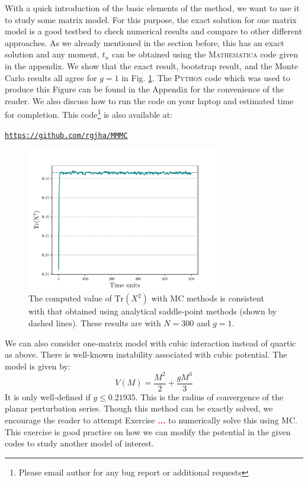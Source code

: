 \documentclass[11pt]{article}
\newcommand{\TODO}[1]{\textcolor{red}{{\bf #1}}}
\newcommand{\MA}{\textsc{Mathematica }}
\newcommand{\PY}{\textsc{Python }}
\begin{document}
With a quick introduction of the basic elements of the method, we want to use it to study some matrix model. For this purpose, 
the exact solution for one matrix model is a good testbed to check numerical results and compare to other different approaches. As we already mentioned in the section before, this has an exact solution and any moment, $t_{n}$ 
can be obtained using the \MA code given in the appendix. We show that the exact result, bootstrap result, and the 
Monte Carlo results all agree for $g=1$ in Fig. \ref{fig:1MM_res}. The \PY code which was used to produce this 
Figure can be found in the Appendix for the convenience of the reader. We also discuss how to run the code
on your laptop and estimated time for completion. This 
code\footnote{Please email author for any bug report or additional requests} is also
available at:

\begin{center} \texttt{\href{https://github.com/rgjha/MMMC}{https://github.com/rgjha/MMMC}} \end{center}

\begin{figure}[htbp] 
\centering 
\includegraphics[width=0.75\textwidth]{figs/mm_plot.pdf}
\caption{\label{fig:1MM_res}The computed value of $\mbox{Tr}(X^2)$ with MC methods is 
consistent with that obtained using analytical saddle-point methods (shown by dashed lines). 
These results are with $N = 300$ and $g = 1$.}
\end{figure}


We can also consider one-matrix model with cubic interaction instead of quartic as above. There is well-known instability associated with cubic potential. The model is given by:
\begin{equation}
	V(M) = \frac{M^2}{2} + \frac{gM^3}{3}  
\end{equation}
It is only well-defined if $g \le 0.21935$. This is the radius of convergence of the planar perturbation series. 
Though this method can be exactly solved, we encourage the reader to attempt Exercise \TODO{...} to numerically solve this 
using MC. This exercise is good practice on how we can modify the potential in the given codes to study another model of interest.
\end{document}
